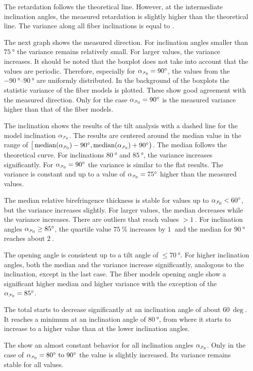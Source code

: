 The retardation follows the theoretical line.
However, at the intermediate inclination angles, the measured retardation is slightly higher than the theoretical line.
The variance along all fiber inclinations is equal to \modelInc{}.
\par
% 
The next graph shows the measured direction.
For inclination angles smaller than $\SI{75}{\degree}$ the variance remains relatively small.
For larger values, the variance increases.
It should be noted that the boxplot does not take into account that the values are periodic.
Therefore, especially for $\modelInc=\SI{90}{\degree}$, the values from the $\SIrange{-90}{90}{\degree}$ are uniformly distributed.
In the background of the boxplots the statistic \bvariance{} variance of the fiber models is plotted.
These show good agreement with the measured direction.
Only for the case $\modelInc=\SI{90}{\degree}$ is the measured \bvariance{} variance higher than that of the fiber models.
\par
%
The inclination shows the results of the tilt analysis with a dashed line for the model inclination $\modelInc$.
The results are centered around the median value in the range of $\big[\median (\modelInc)-\SI{90}{\degree}, \median(\modelInc)+\SI{90}{\degree}\big)$.
The median follows the theoretical curve.
For inclinations $\SI{80}{\degree}$ and $\SI{85}{\degree}$, the variance increases significantly.
For $\modelInc = \SI{90}{\degree}$ the variance is similar to the flat results.
The \bvariance{} variance is constant and up to a value of $\modelInc=\SI{75}{\degree}$ higher than the measured values.
\par
%
The median relative birefringence thickness \trel{} is stable for values up to $\modelInc < \SI{60}{\degree}$, but the variance increases slightly.
For larger values, the median decreases while the variance increases.
There are outliers that reach values $>\SI{1}{}$.
For inclination angles $\modelInc \ge \SI{85}{\degree}$, the quartile value $\SI{75}{\percent}$ increases by $\SI{1}{}$ and the median for $\SI{90}{\degree}$ reaches about $\SI{2}{}$.
\par
%
The opening angle \openingAngle{} is consistent up to a tilt angle of $\le \SI{70}{\degree}$.
For higher inclination angles, both the median and the variance increase significantly, analogous to the inclination, except in the last case.
The fiber models opening angle show a significant higher median and higher \bvariance{} variance with the exception of the $\modelInc=\SI{85}{\degree}$.
\par
% 
The total \accvalue{} starts to decrease significantly at an inclination angle of about $\SI{60}{\deg}$.
It reaches a minimum at an inclination angle of $\SI{80}{\degree}$, from where it starts to increase to a higher value than at the lower inclination angles.
\par
% 
The \rvalue{} show an almost constant behavior for all inclination angles $\modelInc{}$.
Only in the case of $\modelInc=\SIrange[]{80}{90}{\degree}$ the value is slightly increased.
Its variance remains stable for all values.
%
%
%
